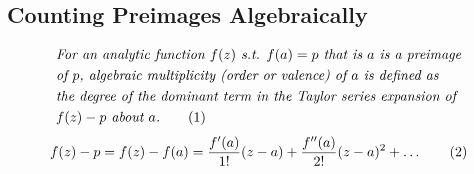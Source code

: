 \documentclass[12pt]{article}
\newcommand\numberthis{\addtocounter{equation}{1}\tag{\theequation}}
\def\tt{\textit}
\begin{document}
\subsection{Counting Preimages Algebraically}
\begin{align*}
    &\tt{For an analytic function $f(z)$ s.t. $f(a)=p$ that is $a$ is a preimage}\\
    &\tt{of $p$, algebraic multiplicity (order or valence) of $a$ is defined as}\\
    &\tt{the degree of the dominant term in the Taylor series expansion of}\\
    &\tt{$f(z)-p$ about $a$.} \numberthis \label{e5}
\end{align*}
\begin{align*}
    f(z)-p = f(z)-f(a) = \frac{f'(a)}{1!}(z-a) + \frac{f''(a)}{2!}(z-a)^2 + \ldots \numberthis \label{e6}
\end{align*}
\end{document}
